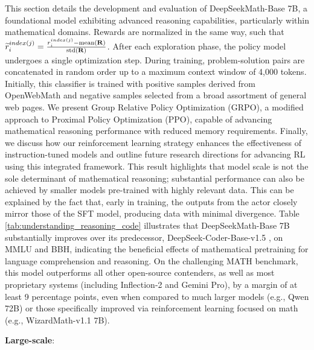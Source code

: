 This section details the development and evaluation of DeepSeekMath-Base 7B, a foundational model exhibiting advanced reasoning capabilities, particularly within mathematical domains. Rewards are normalized in the same way, such that $\widetilde{r}_i^{index(j)} = \frac{r_i^{index(j)} - {\rm mean(\mathbf{R})}}{{\rm std(\mathbf{R})}}$. After each exploration phase, the policy model undergoes a single optimization step. During training, problem-solution pairs are concatenated in random order up to a maximum context window of 4,000 tokens. Initially, this classifier is trained with positive samples derived from OpenWebMath \citep{openwebmath} and negative samples selected from a broad assortment of general web pages. We present Group Relative Policy Optimization (GRPO), a modified approach to Proximal Policy Optimization (PPO), capable of advancing mathematical reasoning performance with reduced memory requirements. Finally, we discuss how our reinforcement learning strategy enhances the effectiveness of instruction-tuned models and outline future research directions for advancing RL using this integrated framework. This result highlights that model scale is not the sole determinant of mathematical reasoning; substantial performance can also be achieved by smaller models pre-trained with highly relevant data. This can be explained by the fact that, early in training, the outputs from the actor closely mirror those of the SFT model, producing data with minimal divergence. Table \ref{tab:understanding_reasoning_code} illustrates that DeepSeekMath-Base 7B substantially improves over its predecessor, DeepSeek-Coder-Base-v1.5 \citep{deepseek-coder}, on MMLU and BBH, indicating the beneficial effects of mathematical pretraining for language comprehension and reasoning. On the challenging MATH benchmark, this model outperforms all other open-source contenders, as well as most proprietary systems (including Inflection-2 and Gemini Pro), by a margin of at least 9 percentage points, even when compared to much larger models (e.g., Qwen 72B) or those specifically improved via reinforcement learning focused on math (e.g., WizardMath-v1.1 7B). \item \textbf{Large-scale}:\\
